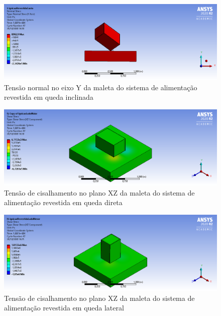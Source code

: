 \begin{apendicesenv}
\begin{figure}[htb]
    \centering
    \includegraphics[width=1.0\textwidth, angle=0]{figuras/estrutura_simulacaoImpacto/ignicaoRevestidaNormalYCanto.png}
    \caption{Tensão normal no eixo Y da maleta do sistema de alimentação revestida em queda inclinada}
    \label{fig:simulacaoImpacto_12}
\end{figure}

\begin{figure}[htb]
    \centering
    \includegraphics[width=1.0\textwidth, angle=0]{figuras/estrutura_simulacaoImpacto/ignicaoRevestidaCisalhamentoXZMaior.png}
    \caption{Tensão de cisalhamento no plano XZ da maleta do sistema de alimentação revestida em queda direta}
    \label{fig:simulacaoImpacto_13}
\end{figure}

\begin{figure}[htb]
    \centering
    \includegraphics[width=1.0\textwidth, angle=0]{figuras/estrutura_simulacaoImpacto/ignicaoRevestidaCisalhamentoXZMenor.png}
    \caption{Tensão de cisalhamento no plano XZ da maleta do sistema de alimentação revestida em queda lateral}
    \label{fig:simulacaoImpacto_14}
\end{figure}


\end{apendicesenv}

